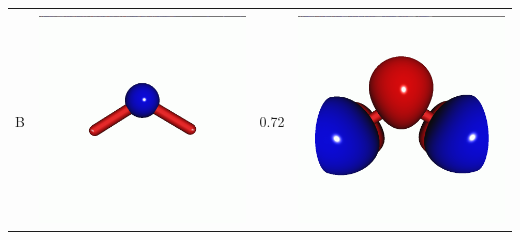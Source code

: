\documentclass[journal=jctcce,manuscript=article]{achemso}
\begin{document}
\begin{table}[H]
\begin{tabular}{ c | c c c }
\begin{minipage}{0.2\textwidth}
    \end{minipage}
    \\
        B &  
    \begin{minipage}{0.2\textwidth}
        \centering
        \includegraphics[scale=0.10]{NTO/O3/2h.png}
    \end{minipage}
    &
    0.72 
    &  \begin{minipage}{0.2\textwidth}
        \centering
        \includegraphics[scale=0.10]{NTO/O3/2p.png}

\end{minipage}
\end{tabular}
\end{table}
\end{document}
